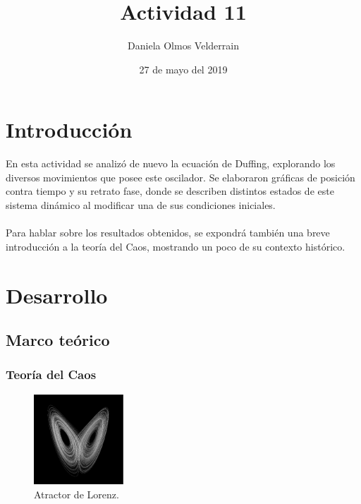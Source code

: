 \documentclass[letterpaper,12pt]{article}
\title{Actividad 11}
\author{Daniela Olmos Velderrain}
\date{27 de mayo del 2019}
\begin{document}
\maketitle

\section{Introducción}
En esta actividad se analizó de nuevo la ecuación de Duffing, explorando los diversos movimientos que posee este oscilador. Se elaboraron gráficas de posición contra tiempo y su retrato fase, donde se describen distintos estados de este sistema dinámico al modificar una de sus condiciones iniciales.\\\\
Para hablar sobre los resultados obtenidos, se expondrá también una breve introducción a la teoría del Caos, mostrando un poco de su contexto histórico.
           
\section{Desarrollo}
            
\subsection{Marco teórico}
\subsubsection{Teoría del Caos}
\begin{figure}
    \centering
    \includegraphics[width=0.3\textwidth]{loo.png}
    \caption{Atractor de Lorenz.}
\end{figure}
\end{document}
